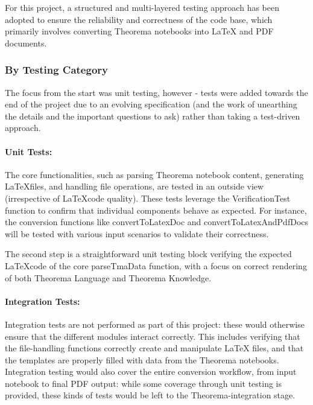 For this project, a structured and multi-layered testing approach has been adopted to ensure the reliability and correctness of the code base, which primarily involves converting Theorema notebooks into LaTeX and PDF documents.

\subsubsection{By Testing Category}

The focus from the start was unit testing, however - tests were added towards the end of the project due to an evolving specification (and the work of unearthing the details and the important questions to ask) rather than taking a test-driven approach.

\paragraph{Unit Tests:}

The core functionalities, such as parsing Theorema notebook content, generating \LaTeX files, and handling file operations, are tested in an outside view (irrespective of \LaTeX code quality). These tests  leverage the VerificationTest function to confirm that individual components behave as expected. For instance, the conversion functions like convertToLatexDoc and convertToLatexAndPdfDocs will be tested with various input scenarios to validate their correctness.

The second step is a straightforward unit testing block verifying the expected \LaTeX code of the core parseTmaData function, with a focus on correct rendering of both Theorema Language and Theorema Knowledge.

\paragraph{Integration Tests:}

Integration tests are not performed as part of this project: these would otherwise ensure that the different modules interact correctly. This includes verifying that the file-handling functions correctly create and manipulate LaTeX files, and that the templates are properly filled with data from the Theorema notebooks. Integration testing would also cover the entire conversion workflow, from input notebook to final PDF output: while some coverage through unit testing is provided, these kinds of tests would be left to the Theorema-integration stage.

